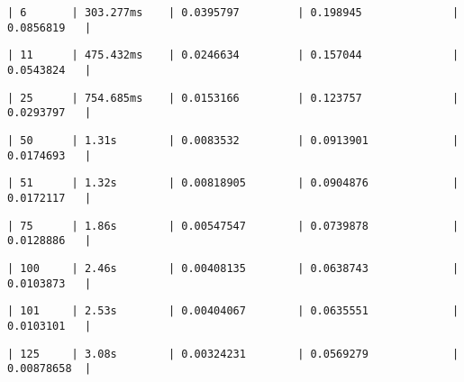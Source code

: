 \documentclass[11pt]{article}
\begin{document}
    
    
    \begin{verbatim}
| 6       | 303.277ms    | 0.0395797         | 0.198945              | 0.0856819   |
    \end{verbatim}

    
    
    \begin{verbatim}
| 11      | 475.432ms    | 0.0246634         | 0.157044              | 0.0543824   |
    \end{verbatim}

    
    
    \begin{verbatim}
| 25      | 754.685ms    | 0.0153166         | 0.123757              | 0.0293797   |
    \end{verbatim}

    
    
    \begin{verbatim}
| 50      | 1.31s        | 0.0083532         | 0.0913901             | 0.0174693   |
    \end{verbatim}

    
    
    \begin{verbatim}
| 51      | 1.32s        | 0.00818905        | 0.0904876             | 0.0172117   |
    \end{verbatim}

    
    
    \begin{verbatim}
| 75      | 1.86s        | 0.00547547        | 0.0739878             | 0.0128886   |
    \end{verbatim}

    
    
    \begin{verbatim}
| 100     | 2.46s        | 0.00408135        | 0.0638743             | 0.0103873   |
    \end{verbatim}

    
    
    \begin{verbatim}
| 101     | 2.53s        | 0.00404067        | 0.0635551             | 0.0103101   |
    \end{verbatim}

    
    
    \begin{verbatim}
| 125     | 3.08s        | 0.00324231        | 0.0569279             | 0.00878658  |
    \end{verbatim}
\end{document}
